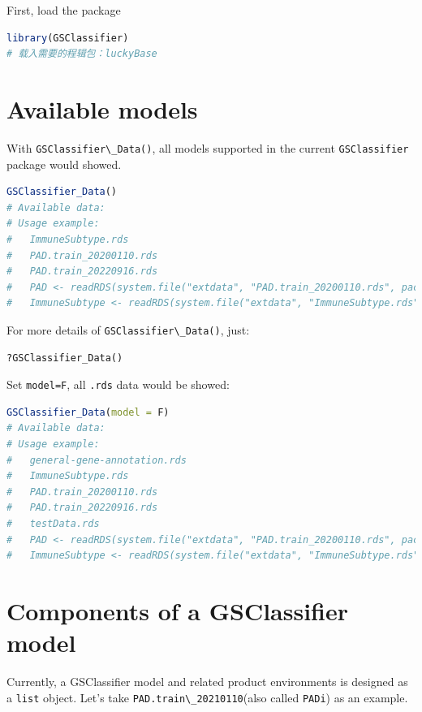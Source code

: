 \documentclass[
  12pt,
]{book}
\newcommand{\passthrough}[1]{#1}
\begin{document}
First, load the package

\begin{lstlisting}[language=R]
library(GSClassifier)
# 载入需要的程辑包：luckyBase
\end{lstlisting}

\hypertarget{available-models}{%
\section{Available models}\label{available-models}}

With \passthrough{\lstinline!GSClassifier\_Data()!}, all models supported in the current \passthrough{\lstinline!GSClassifier!} package would showed.

\begin{lstlisting}[language=R]
GSClassifier_Data()
# Available data:
# Usage example:
#   ImmuneSubtype.rds 
#   PAD.train_20200110.rds 
#   PAD.train_20220916.rds 
#   PAD <- readRDS(system.file("extdata", "PAD.train_20200110.rds", package = "GSClassifier")) 
#   ImmuneSubtype <- readRDS(system.file("extdata", "ImmuneSubtype.rds", package = "GSClassifier"))
\end{lstlisting}

For more details of \passthrough{\lstinline!GSClassifier\_Data()!}, just:

\begin{lstlisting}
?GSClassifier_Data()
\end{lstlisting}

Set \passthrough{\lstinline!model=F!}, all \passthrough{\lstinline!.rds!} data would be showed:

\begin{lstlisting}[language=R]
GSClassifier_Data(model = F)
# Available data:
# Usage example:
#   general-gene-annotation.rds 
#   ImmuneSubtype.rds 
#   PAD.train_20200110.rds 
#   PAD.train_20220916.rds 
#   testData.rds 
#   PAD <- readRDS(system.file("extdata", "PAD.train_20200110.rds", package = "GSClassifier")) 
#   ImmuneSubtype <- readRDS(system.file("extdata", "ImmuneSubtype.rds", package = "GSClassifier"))
\end{lstlisting}

\hypertarget{components-of-a-gsclassifier-model}{%
\section{Components of a GSClassifier model}\label{components-of-a-gsclassifier-model}}

Currently, a GSClassifier model and related product environments is designed as a \passthrough{\lstinline!list!} object. Let's take \passthrough{\lstinline!PAD.train\_20210110!}(also called \passthrough{\lstinline!PADi!}) as an example.
\end{document}
